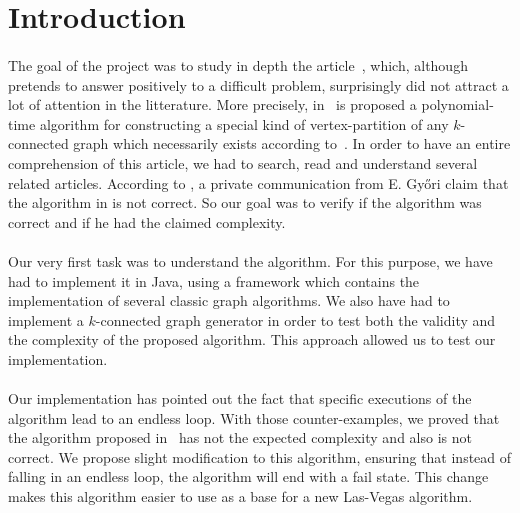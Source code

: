 \section{Introduction}
\paragraph{}
The goal of the project was to study in depth the article~\cite{JS94}, which,
although pretends to answer positively to a difficult problem,
surprisingly did not attract a lot of attention in the litterature.
More precisely, in~\cite{JS94} is proposed a polynomial-time algorithm for
constructing a special kind of vertex-partition of any $k$-connected graph
which necessarily exists according to~\cite{GE78,LL77}.
In order to have an entire comprehension of this article, we had to search,
read and understand several related articles.
According to \cite{Nakano1997315}, a private communication from E. Gy{\H o}ri
claim that the algorithm in \cite{JS94} is not correct. So our goal was to 
verify if the algorithm was correct and if he had the claimed complexity.


\paragraph{}
Our very first task was to understand the algorithm. For this purpose, we have 
had to implement it in Java, using a framework which contains the implementation
of several classic graph algorithms.
We also have had to implement a $k$-connected graph generator in order to test both
the validity and the complexity of the proposed algorithm. This approach allowed
us to test our implementation.

\paragraph{}
Our implementation has pointed out the fact that specific executions of the
algorithm lead to an endless loop. With those counter-examples, we
proved that the algorithm proposed in~\cite{JS94} has not the expected
complexity and also is not correct.
We propose slight modification to this algorithm, ensuring that instead of
falling in an endless loop, the algorithm will end with a fail state. This
change makes this algorithm easier to use as a base for a new Las-Vegas
algorithm.
